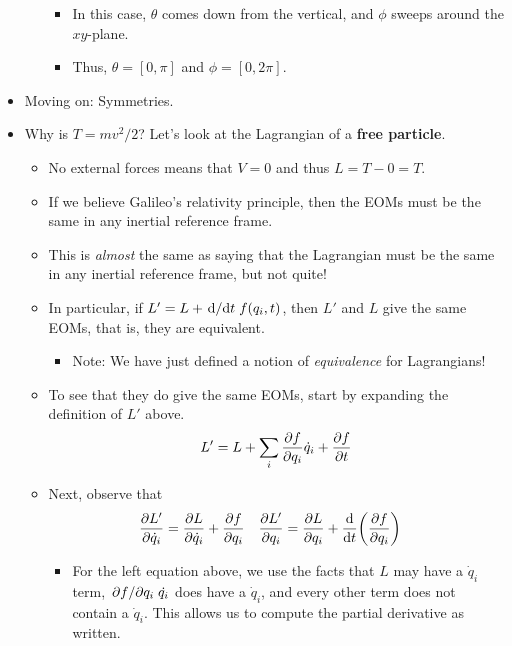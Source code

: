 \documentclass[../notes.tex]{subfiles}
\begin{document}
\begin{itemize}
\begin{itemize}
        \begin{itemize}
            \item In this case, $\theta$ comes down from the vertical, and $\phi$ sweeps around the $xy$-plane.
            \item Thus, $\theta=[0,\pi]$ and $\phi=[0,2\pi]$.
        \end{itemize}
    \end{itemize}
    \item Moving on: Symmetries.
    \item Why is $T=mv^2/2$? Let's look at the Lagrangian of a \textbf{free particle}.
    \begin{itemize}
        \item No external forces means that $V=0$ and thus $L=T-0=T$.
        \item If we believe Galileo's relativity principle, then the EOMs must be the same in any inertial reference frame.
        \item This is \emph{almost} the same as saying that the Lagrangian must be the same in any inertial reference frame, but not quite!
        \item In particular, if $L'=L+\dv*{t}f(q_i,t)$, then $L'$ and $L$ give the same EOMs, that is, they are equivalent.
        \begin{itemize}
            \item Note: We have just defined a notion of \emph{equivalence} for Lagrangians!
        \end{itemize}
        \item To see that they do give the same EOMs, start by expanding the definition of $L'$ above.
        \begin{equation*}
            L' = L+\sum_i\pdv{f}{q_i}\dot{q}_i+\pdv{f}{t}
        \end{equation*}
        \item Next, observe that
        \begin{align*}
            \pdv{L'}{\dot{q}_i} &= \pdv{L}{\dot{q}_i}+\pdv{f}{q_i}&
            \pdv{L'}{q_i} &= \pdv{L}{q_i}+\dv{t}(\pdv{f}{q_i})
        \end{align*}
        \begin{itemize}
            \item For the left equation above, we use the facts that $L$ may have a $\dot{q}_i$ term, $\pdv*{f}{q_i}\dot{q_i}$ does have a $\dot{q}_i$, and every other term does not contain a $\dot{q}_i$. This allows us to compute the partial derivative as written.

\end{itemize}
\end{itemize}
\end{itemize}
\end{document}
